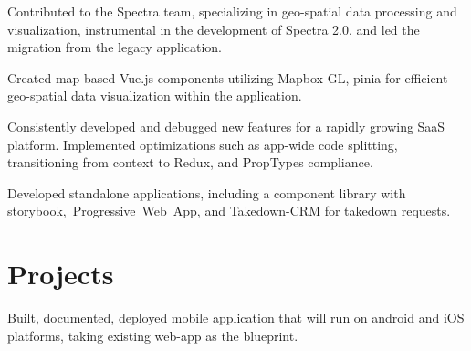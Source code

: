 \documentclass[]{plushcv}
\begin{document}
\begin{minipage}[t]{0.70\textwidth}
\vspace{\topsep} %
\begin{tightemize}
\item Contributed to the Spectra team, specializing in geo-spatial data processing and \mbox{visualization}, instrumental in the development of Spectra 2.0, and led the migration from the legacy application.

\item Created map-based Vue.js components utilizing Mapbox GL, pinia for efficient \mbox{geo-spatial} data visualization within the application.

\end{tightemize}
\sectionbottomsep


\vspace{\topsep} %
\begin{tightemize}
\item Consistently developed and debugged new features for a rapidly growing SaaS \mbox{platform}. \mbox{Implemented} optimizations such as app-wide code splitting, transitioning from context to Redux, and PropTypes compliance. 
\item Developed standalone applications, including a component library with storybook,\mbox{ Progressive Web App}, and Takedown-CRM for takedown requests. 

\end{tightemize}
\sectionbottomsep




\section{Projects}

\begin{tightemize}
\item Built, documented, deployed mobile application that will run on android and iOS \mbox{platforms}, taking existing web-app as the blueprint.
\end{tightemize}
\sectionbottomsep


\end{minipage}
\end{document}
